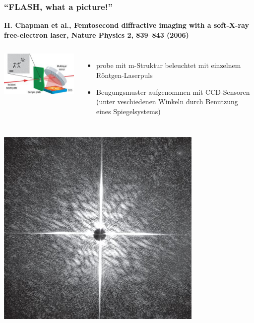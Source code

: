 \documentclass[10pt,t]{beamer}
\begin{document}
\begin{frame}
\frametitle{``FLASH, what a picture!''}
\vspace*{-2.6\baselineskip}
\alert{\bfseries\footnotesize H. Chapman et al., Femtosecond diffractive imaging with a soft-X-ray free-electron laser, Nature Physics 2, 839--843 (2006)}
\vspace*{\baselineskip}
\begin{columns}[c]
\includegraphics[width=\textwidth]{flash-aufbau}
\begin{itemize}
    \item probe mit \textmu m-Struktur beleuchtet mit einzelnem Röntgen-Laserpuls
    \item Beugungsmuster aufgenommen mit CCD-Sensoren (unter veschiedenen Winkeln durch Benutzung eines Spiegelsystems)
\end{itemize}
\end{columns}
\vspace*{1ex}
\begin{columns}[c]
\includegraphics[width=\textwidth]{flash-beugungsbild}

\end{columns}
\end{frame}
\end{document}
